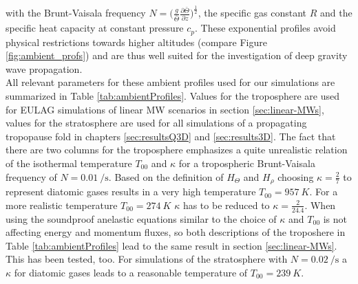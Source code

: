 with the Brunt-Vaisala frequency $N=\bigl(\frac{g}{\bar{\Theta}}\frac{\partial \bar{\Theta}}{\partial z}\bigr)^{\frac{1}{2}}$, the specific gas constant $R$ and the specific heat capacity at constant pressure $c_p$. These exponential profiles avoid physical restrictions towards higher altitudes (compare Figure \ref{fig:ambient_profs}) and are thus well suited for the investigation of deep gravity wave propagation. \\
All relevant parameters for these ambient profiles used for our simulations are summarized in Table \ref{tab:ambientProfiles}. Values for the troposphere are used for EULAG simulations of linear MW scenarios in section \ref{sec:linear-MWs}, values for the stratosphere are used for all simulations of a propagating tropopause fold in chapters \ref{sec:resultsQ3D} and \ref{sec:results3D}. The fact that there are two columns for the troposphere emphasizes a quite unrealistic relation of the isothermal temperature $T_{00}$ and $\kappa$ for a tropospheric Brunt-Vaisala frequency of $N=\SI{0.01}{\per\second}$. Based on the definition of $H_{\Theta}$ and $H_{\rho}$ choosing $\kappa=\frac{2}{7}$ to represent diatomic gases results in a very high temperature $T_{00} = \SI{957}{K}$. For a more realistic temperature $T_{00} = \SI{274}{K}$ $\kappa$ has to be reduced to $\kappa=\frac{2}{24.4}$. When using the soundproof anelastic equations similar to \textcite[]{lipps_scale_1982} the choice of $\kappa$ and $T_{00}$ is not affecting energy and momentum fluxes, so both descriptions of the troposhere in Table \ref{tab:ambientProfiles} lead to the same result in section \ref{sec:linear-MWs}. This has been tested, too. For simulations of the stratosphere with $N=\SI{0.02}{\per\second}$ a $\kappa$ for diatomic gases leads to a reasonable temperature of $T_{00} = \SI{239}{K}$.
